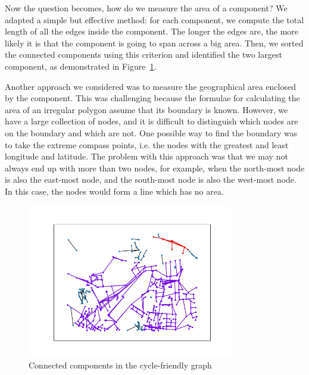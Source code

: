 \documentclass[12pt,a4paper]{report}
\begin{document}
Now the question becomes, how do we measure the area of a component? We adapted a simple but effective method: for each component, we compute the total length of all the edges inside the component. The longer the edges are, the more likely it is that the component is going to span across a big area. Then, we sorted the connected components using this criterion and identified the two largest component, as demonstrated in Figure~\ref{fig:component}.

Another approach we considered was to measure the geographical area enclosed by the component. This was challenging because the formulae for calculating the area of an irregular polygon assume that its boundary is known. However, we have a large collection of nodes, and it is difficult to distinguish which nodes are on the boundary and which are not. One possible way to find the boundary was to take the extreme compass points, i.e. the nodes with the greatest and least longitude and latitude. The problem with this approach was that we may not always end up with more than two nodes, for example, when the north-most node is also the east-most node, and the south-most node is also the west-most node. In this case, the nodes would form a line which has no area.

\begin{figure}[ht]
    \centering
    \includegraphics[width=0.8\textwidth,trim={2.5cm 1.5cm 1.7cm 1.7cm},clip]{plan_images/components.png}
    \caption{Connected components in the cycle-friendly graph}
    \label{fig:component}
\end{figure}
\end{document}
